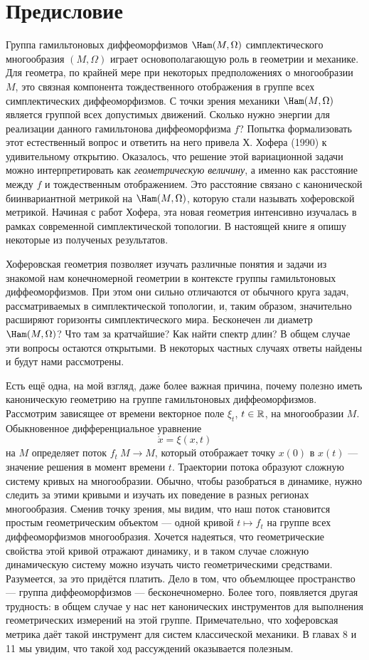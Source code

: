 \chapter*{Предисловие}

Группа гамильтоновых диффеоморфизмов $\Ham(M,\Omega)$ симплектического
многообразия $(M,\Omega)$ играет
основополагающую роль в геометрии и
механике.
Для геометра, по крайней мере при некоторых предположениях
о многообразии $M$, это связная компонента тождественного отображения
в группе всех симплектических диффеоморфизмов.
С точки зрения
механики $\Ham(M,\Omega)$ является группой всех допустимых движений.
Сколько нужно энергии для реализации данного гамильтонова диффеоморфизма $f$?
Попытка формализовать этот естественный вопрос и ответить на него привела Х. Хофера \cite{H1} (1990) к удивительному открытию.
Оказалось, что решение этой вариационной задачи можно интерпретировать как {}\emph{геометрическую величину}, а именно как расстояние между $f$ и тождественным
отображением.
Это расстояние связано с канонической биинвариантной метрикой на $\Ham(M,\Omega)$, которую стали называть хоферовской метрикой.
Начиная с работ Хофера, эта новая геометрия интенсивно изучалась в рамках современной
симплектической топологии.
В настоящей книге я опишу некоторые из полученых результатов.


Хоферовская геометрия позволяет изучать различные понятия и задачи из знакомой нам конечномерной геометрии в контексте группы гамильтоновых диффеоморфизмов.
При этом они сильно отличаются от обычного круга задач, рассматриваемых в симплектической топологии, и, таким образом, значительно расширяют горизонты симплектического мира.
Бесконечен ли диаметр $\Ham(M,\Omega)$?
Что там за кратчайшие?
Как найти спектр длин?
В общем случае эти вопросы остаются открытыми.
В некоторых частных случаях ответы найдены и будут нами рассмотрены.

Есть ещё одна, на мой взгляд, даже более важная причина, почему полезно иметь каноническую геометрию на группе гамильтоновых диффеоморфизмов.
Рассмотрим зависящее от времени векторное поле $\xi_t$, $t\in \mathbb{R}$, на многообразии $M$.
Обыкновенное дифференциальное уравнение
\[\dot x=\xi(x,t)\]
на $M$ определяет поток $f_t\: M \to M$, который отображает точку $x(0)$ в $x(t)$ — значение решения в момент времени $t$.
Траектории потока образуют сложную систему кривых на многообразии.
Обычно, чтобы разобраться в динамике, нужно следить за этими кривыми и изучать их поведение в разных регионах многообразия.
Сменив точку зрения, мы видим, что наш поток становится простым
геометрическим объектом — одной кривой $t \mapsto f_t$ на группе всех диффеоморфизмов многообразия.
Хочется надеяться, что геометрические свойства этой кривой отражают динамику, и в таком случае сложную динамическую систему можно изучать чисто геометрическими средствами. 
Разумеется, за это придётся платить.
Дело в том, что объемлющее пространство — группа
диффеоморфизмов — бесконечномерно.
Более того, появляется другая трудность:
в общем случае у нас нет канонических инструментов для выполнения геометрических измерений на этой группе.
Примечательно, что хоферовская метрика даёт такой инструмент для систем классической механики.
В главах 8 и 11 мы увидим, что такой ход рассуждений оказывается полезным.

